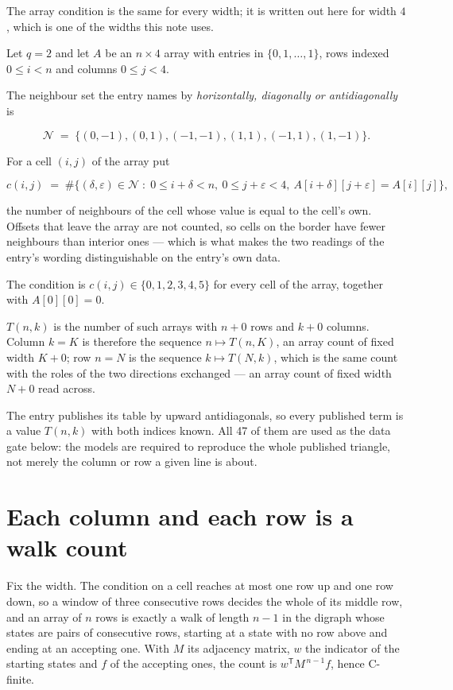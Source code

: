 \documentclass[11pt]{article}
\theoremstyle{definition}
\begin{document}
The array condition is the same for every width; it is written out here for width $4$, which is one of the widths this note uses.

Let $q = 2$ and let $A$ be an $n \times 4$ array with entries in $\{0,1,\dots,1\}$, rows indexed $0 \le i < n$ and columns $0 \le j < 4$.

The neighbour set the entry names by {\itshape horizontally, diagonally or antidiagonally} is

\[\mathcal{N} \;=\; \{(0,-1), (0,1), (-1,-1), (1,1), (-1,1), (1,-1)\}.\]

For a cell $(i,j)$ of the array put

\[c(i,j) \;=\; \#\bigl\{(\delta,\varepsilon)\in\mathcal{N} \;:\; 0\le i+\delta<n,\ 0\le j+\varepsilon<4,\ A[i+\delta][j+\varepsilon] = A[i][j]\bigr\},\]

the number of neighbours of the cell whose value is equal to the cell's own. Offsets that leave the array are not counted, so cells on the border have fewer neighbours than interior ones --- which is what makes the two readings of the entry's wording distinguishable on the entry's own data.

The condition is $c(i,j) \in \{0, 1, 2, 3, 4, 5\}$ for every cell of the array, together with $A[0][0]=0$.

$T(n,k)$ is the number of such arrays with $n + 0$ rows and $k + 0$ columns. Column $k = K$ is therefore the sequence $n \mapsto T(n,K)$, an array count of fixed width $K + 0$; row $n = N$ is the sequence $k \mapsto T(N,k)$, which is the same count with the roles of the two directions exchanged --- an array count of fixed width $N + 0$ read across.

The entry publishes its table by upward antidiagonals, so every published term is a value $T(n,k)$ with both indices known. All 47 of them are used as the data gate below: the models are required to reproduce the whole published triangle, not merely the column or row a given line is about.

\section{Each column and each row is a walk count}

Fix the width. The condition on a cell reaches at most one row up and one row down, so a window of three consecutive rows decides the whole of its middle row, and an array of $n$ rows is exactly a walk of length $n-1$ in the digraph whose states are pairs of consecutive rows, starting at a state with no row above and ending at an accepting one. With $M$ its adjacency matrix, $w$ the indicator of the starting states and $f$ of the accepting ones, the count is $w^{\mathsf T}M^{\,n-1}f$, hence C-finite.
\end{document}
